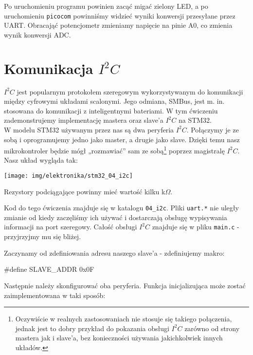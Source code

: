 \documentclass{pdfBooklets}
\begin{document}
Po uruchomieniu programu powinien zacąć migać zielony LED, a po uruchomieniu \Verb$picocom$ powinniśmy widzieć wyniki konwersji
przesyłane przez UART. Obracająć potencjometr zmieniamy napięcie na pinie A0, co zmienia wynik konwersji ADC.


\section{Komunikacja $I^2C$}
$I^2C$ jest popularnym protokołem szeregowym wykorzystywanym do komunikacji między cyfrowymi układami scalonymi. Jego odmiana, SMBus, jest m. in.
stosowana do komunikacji z inteligentnymi bateriami. W tym ćwiczeniu zademonstrujemy implementację mastera oraz slave'a $I^2C$ na STM32.\\

W modelu STM32 używanym przez nas są dwa peryferia $I^2C$. Połączymy je ze sobą i oprogramujemy jedno jako master, a drugie jako slave.
Dzięki temu nasz mikrokontroler będzie mógł „rozmawiać” sam ze sobą\footnote{
	Oczywiście w realnych zastosowaniach nie stosuje się takiego połączenia, jednak jest to dobry przykład do pokazania obsługi $I^2C$
	zarówno od strony mastera jak i slave'a, bez konieczności używania jakichkolwiek innych układów.
} poprzez magistralę $I^2C$.
Nasz układ wygląda tak:

\begin{center}\texttt{[image: img/elektronika/stm32\_04\_i2c]}\end{center}

Rezystory podciągające powinny mieć wartość kilku k$\Omega$.

Kod do tego ćwiczenia znajduje się w katalogu \Verb$04_i2c$.
Pliki \Verb$uart.*$ nie uległy zmianie od kiedy zaczęliśmy ich używać i dostarczają obsługę wypisywania informacji na port szeregowy.
Całość obsługi $I^2C$ znajduje się w pliku \Verb$main.c$ - przyjrzyjmy mu się bliżej.

Zaczynamy od zdefiniowania adresu naszego slave'a - zdefiniujemy makro:

\begin{CodeFrame*}[c]{}
#define SLAVE_ADDR 0x0F
\end{CodeFrame*}

Następnie należy skonfigurować oba peryferia. Funkcja inicjalizująca może zostać zaimplementowana w taki sposób:
\end{document}
